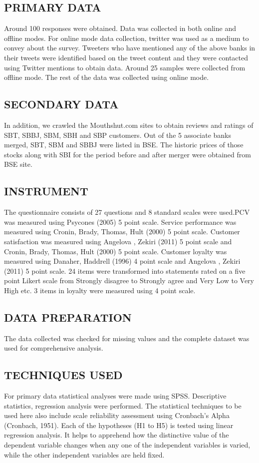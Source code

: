 \documentclass[a4paper, 12pt]{extarticle}
\begin{document}
{\subsection{PRIMARY DATA}
\par Around 100 responses were obtained. Data was collected in both online and offline modes. For online mode data collection, twitter was used as a medium to convey about the survey. Tweeters who have mentioned any of the above banks in their tweets were identified based on the tweet content and they were contacted using Twitter mentions to obtain data. Around 25 samples were collected from offline mode. The rest of the data was collected using online mode.
\subsection{SECONDARY DATA}
In addition, we crawled the Mouthshut.com sites to obtain reviews and ratings of SBT, SBBJ, SBM, SBH and SBP customers. Out of the 5 associate banks merged, SBT, SBM and SBBJ were listed in BSE. The historic prices of those stocks along with SBI for the period before and after merger were obtained from BSE site.

\subsection{INSTRUMENT}
The questionnaire consists of 27 questions and 8 standard scales were used.PCV was measured using Psycones (2005)  5 point scale. Service performance was measured using Cronin, Brady, Thomas, Hult (2000)  5 point scale. Customer satisfaction was measured using 
Angelova , Zekiri (2011)  5 point scale and Cronin, Brady, Thomas, Hult (2000)  5 point scale. Customer loyalty was measured using Danaher, Haddrell (1996) 4 point scale and Angelova , Zekiri (2011) 5 point scale. 24 items were transformed into statements rated on a five  point Likert scale from Strongly disagree to Strongly agree and Very Low to Very High etc. 3 items in loyalty were measured using 4 point scale.

\subsection{DATA PREPARATION}
The data collected was checked for missing values and the complete dataset was used for comprehensive analysis.

\subsection{TECHNIQUES USED}
For primary data statistical analyses were made using SPSS. Descriptive statistics, regression analysis were performed. The statistical techniques to be used here also include scale reliability assessment using Cronbach's Alpha (Cronbach, 1951). Each of the hypotheses (H1 to H5) is tested using linear regression analysis. It helps to apprehend how the distinctive value of the dependent variable changes when any one of the independent variables is varied, while the other independent variables are held fixed.

}
\end{document}
